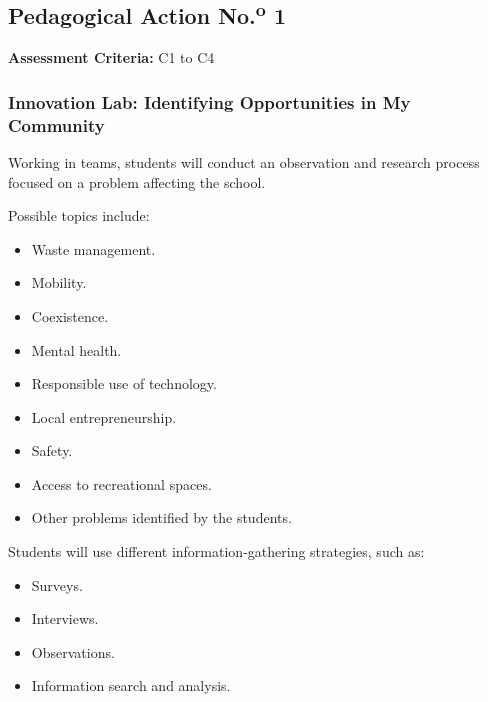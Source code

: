 \documentclass[12pt,a4paper]{article}
\begin{document}
	
	\subsection{Pedagogical Action No.\textsuperscript{o} 1}
	
	\textbf{Assessment Criteria:} C1 to C4
	
	\subsubsection*{Innovation Lab: Identifying Opportunities in My Community}
	
	Working in teams, students will conduct an observation and research
	process focused on a problem affecting the school.
	
	Possible topics include:
	
	\begin{itemize}
		
		\item Waste management.
		
		\item Mobility.
		
		\item Coexistence.
		
		\item Mental health.
		
		\item Responsible use of technology.
		
		\item Local entrepreneurship.
		
		\item Safety.
		
		\item Access to recreational spaces.
		
		\item Other problems identified by the students.
		
	\end{itemize}
	
	Students will use different information-gathering strategies, such as:
	
	\begin{itemize}
		
		\item Surveys.
		
		\item Interviews.
		
		\item Observations.
		
		\item Information search and analysis.
		
	\end{itemize}
	
\end{document}
